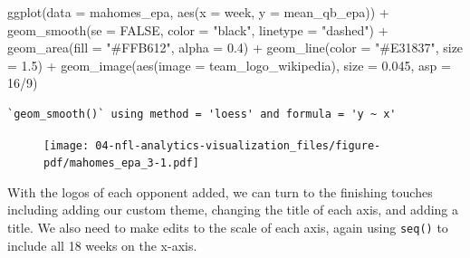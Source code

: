 \documentclass[
  letterpaper,
]{krantz}
\newenvironment{Shaded}{\begin{snugshade}}{\end{snugshade}}
\newcommand{\AttributeTok}[1]{\textcolor[rgb]{0.40,0.45,0.13}{#1}}
\newcommand{\ConstantTok}[1]{\textcolor[rgb]{0.56,0.35,0.01}{#1}}
\newcommand{\DecValTok}[1]{\textcolor[rgb]{0.68,0.00,0.00}{#1}}
\newcommand{\FloatTok}[1]{\textcolor[rgb]{0.68,0.00,0.00}{#1}}
\newcommand{\FunctionTok}[1]{\textcolor[rgb]{0.28,0.35,0.67}{#1}}
\newcommand{\NormalTok}[1]{\textcolor[rgb]{0.00,0.23,0.31}{#1}}
\newcommand{\SpecialCharTok}[1]{\textcolor[rgb]{0.37,0.37,0.37}{#1}}
\newcommand{\StringTok}[1]{\textcolor[rgb]{0.13,0.47,0.30}{#1}}
\begin{document}
\begin{Shaded}
\begin{Highlighting}[]
\FunctionTok{ggplot}\NormalTok{(}\AttributeTok{data =}\NormalTok{ mahomes\_epa, }\FunctionTok{aes}\NormalTok{(}\AttributeTok{x =}\NormalTok{ week, }\AttributeTok{y =}\NormalTok{ mean\_qb\_epa)) }\SpecialCharTok{+}
  \FunctionTok{geom\_smooth}\NormalTok{(}\AttributeTok{se =} \ConstantTok{FALSE}\NormalTok{, }\AttributeTok{color =} \StringTok{"black"}\NormalTok{, }\AttributeTok{linetype =} \StringTok{"dashed"}\NormalTok{) }\SpecialCharTok{+}
  \FunctionTok{geom\_area}\NormalTok{(}\AttributeTok{fill =} \StringTok{"\#FFB612"}\NormalTok{, }\AttributeTok{alpha =} \FloatTok{0.4}\NormalTok{) }\SpecialCharTok{+}
  \FunctionTok{geom\_line}\NormalTok{(}\AttributeTok{color =} \StringTok{"\#E31837"}\NormalTok{, }\AttributeTok{size =} \FloatTok{1.5}\NormalTok{) }\SpecialCharTok{+}
  \FunctionTok{geom\_image}\NormalTok{(}\FunctionTok{aes}\NormalTok{(}\AttributeTok{image =}\NormalTok{ team\_logo\_wikipedia), }\AttributeTok{size =} \FloatTok{0.045}\NormalTok{, }\AttributeTok{asp =} \DecValTok{16}\SpecialCharTok{/}\DecValTok{9}\NormalTok{)}
\end{Highlighting}
\end{Shaded}

\begin{verbatim}
`geom_smooth()` using method = 'loess' and formula = 'y ~ x'
\end{verbatim}

\begin{figure}[H]

{\centering \texttt{[image: 04-nfl-analytics-visualization\_files/figure-pdf/mahomes\_epa\_3-1.pdf]}

}

\end{figure}

With the logos of each opponent added, we can turn to the finishing
touches including adding our custom theme, changing the title of each
axis, and adding a title. We also need to make edits to the scale of
each axis, again using \texttt{seq()} to include all 18 weeks on the
x-axis.
\end{document}
